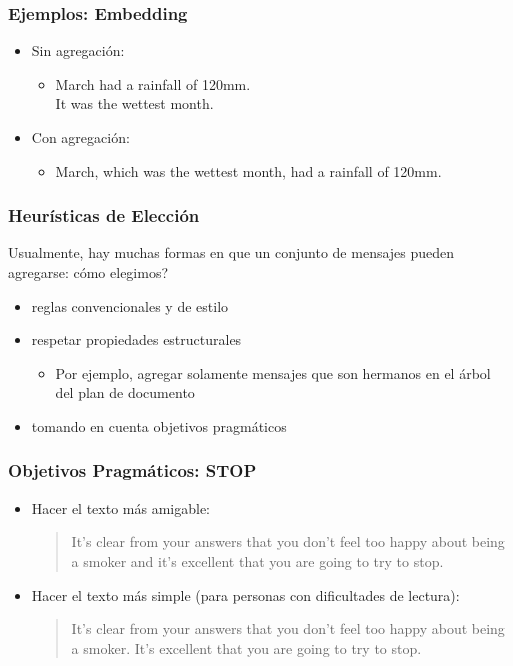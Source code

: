 \documentclass[compress,color=usenames]{beamer}
\begin{document}
\begin{frame}
\frametitle{Ejemplos: Embedding}

\label{f208}
\begin{itemize}
\item { {Sin agregaci\'on:}}
\begin{itemize}
\item March had a rainfall of 120mm.\\ 
It was the wettest month.
\end{itemize}
\item { {Con agregaci\'on:}}
\begin{itemize}
\item March, which was the wettest month, had a rainfall of 120mm.
\end{itemize}
\end{itemize}
 
\end{frame}

\begin{frame}
\frametitle{Heur\'isticas de Elecci\'on}

 Usualmente, hay muchas formas en que un conjunto de mensajes pueden agregarse: c\'omo elegimos? 

\label{f210}
\begin{itemize}
\item reglas convencionales y de estilo 
\item respetar propiedades estructurales 
\begin{itemize}
\item Por ejemplo, agregar solamente mensajes que son hermanos en el \'arbol del plan de documento
\end{itemize}
\item tomando en cuenta objetivos pragm\'aticos
\end{itemize}
 
\end{frame}

\begin{frame}
\frametitle{Objetivos Pragm\'aticos: STOP}

\label{f212}
\begin{itemize}
\item Hacer el texto m\'as amigable:
\begin{quote}
 It's clear from your answers that you don't feel too happy about being a smoker and it's excellent that you are going to try to stop.
\end{quote}
\item Hacer el texto m\'as simple (para personas con dificultades de lectura):
\begin{quote}
 It's clear from your answers that you don't feel too happy about being a smoker. It's excellent that you are going to try to stop.
\end{quote}
\end{itemize}
 
\end{frame}
\end{document}
